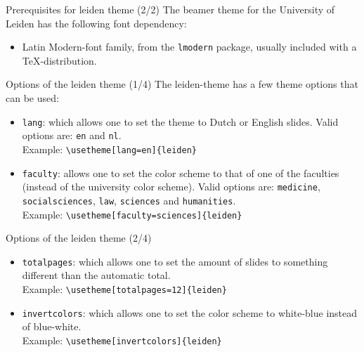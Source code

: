 \documentclass[t,11pt]{beamer}
\begin{document}
\begin{frame}[fragile]{Prerequisites for leiden theme (2/2)}
\small
The beamer theme for the University of Leiden has the following
font dependency:
\begin{itemize}
\item	Latin Modern-font family, from the \texttt{lmodern}
		package, usually included with a \TeX-distribution.
\end{itemize}
\end{frame}

\begin{frame}[fragile]{Options of the leiden theme (1/4)}
The leiden-theme has a few theme options that can be used:

\begin{itemize}
\item	\alert{\texttt{lang}}: which allows one to set the theme
		to Dutch or English slides.
		Valid options are: \verb|en| and \verb|nl|.\\
\vspace{0.1\baselineskip}
		Example: \verb|\usetheme[lang=en]{leiden}|
\vspace{0.5\baselineskip}
\item	\alert{\texttt{faculty}}: allows one to set the color
		scheme to that of one of the faculties (instead of the
		university color scheme).
		Valid options are: \verb|medicine|, \verb|socialsciences|,
		\verb|law|, \verb|sciences| and \verb|humanities|.\\
\vspace{0.1\baselineskip}
		Example: \verb|\usetheme[faculty=sciences]{leiden}|
\end{itemize}
\end{frame}

\begin{frame}[fragile]{Options of the leiden theme (2/4)}
\begin{itemize}
\item	\alert{\texttt{totalpages}}: which allows one to set the
		amount of slides to something different than the
		automatic total.\\
\vspace{0.1\baselineskip}
		Example: \verb|\usetheme[totalpages=12]{leiden}|
\vspace{0.5\baselineskip}
\item	\alert{\texttt{invertcolors}}: which allows one to set the color
		scheme to white-blue instead of blue-white.\\
\vspace{0.1\baselineskip}
		Example: \verb|\usetheme[invertcolors]{leiden}|
\end{itemize}
\end{frame}
\end{document}
